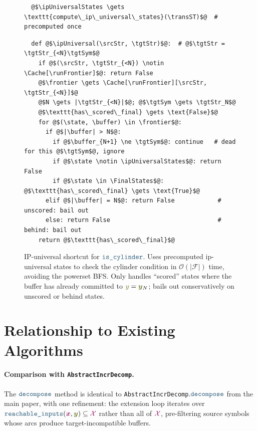 \documentclass{article}
\theoremstyle{plain}
\newcommand{\mymacro}[1]{#1}
\newcommand{\srcStr}{\ensuremath{{\color{TokenColor}\boldsymbol{x}}}\xspace}
\newcommand{\tgtSym}{{\color{CharacterColor}y}}
\newcommand{\tgtStr}{{\color{CharacterColor}\boldsymbol{y}}}
\newcommand{\srcAlphabet}[0]{{\color{TokenColor}\ensuremath{\mathcal{X}}}\xspace}
\newcommand{\transST}{{\color{CharacterColor}\texttt{f}}}
\newcommand{\FinalStates}{\mymacro{\mathsf{F}}}
\newcommand{\state}{\mymacro{s}}
\newcommand{\frontier}{\mathcal{F}}
\newcommand{\buffer}{{\color{CharacterColor}\boldsymbol{b}}}
\newcommand{\myMintedFunc}[1]{\mbox{\texttt{{\color{StormBlue}#1}}}}
\newcommand{\continuous}[0]{\myMintedFunc{is\_cylinder}}
\newcommand{\decompose}[0]{\myMintedFunc{decompose}}
\newcommand{\runFrontier}[0]{\myMintedFunc{run}}
\newcommand{\reachableInputs}[0]{\myMintedFunc{reachable\_inputs}}
\newcommand{\ipUniversal}[0]{\myMintedFunc{fast\_univ\_filter}}
\newcommand{\ipUniversalStates}[0]{U}
\newcommand{\Cache}{\mymacro{\texttt{cache}}}
\begin{document}
\begin{figure}[H]
\centering
\begin{verbatim}
  @$\ipUniversalStates \gets \texttt{compute\_ip\_universal\_states}(\transST)$@  # precomputed once
\end{verbatim}
\begin{verbatim}
  def @$\ipUniversal(\srcStr, \tgtStr)$@:  # @$\tgtStr = \tgtStr_{<N}\tgtSym$@
    if @$(\srcStr, \tgtStr_{<N}) \notin \Cache[\runFrontier]$@: return False
    @$\frontier \gets \Cache[\runFrontier][\srcStr, \tgtStr_{<N}]$@
    @$N \gets |\tgtStr_{<N}|$@; @$\tgtSym \gets \tgtStr_N$@
    @$\texttt{has\_scored\_final} \gets \text{False}$@
    for @$(\state, \buffer) \in \frontier$@:
      if @$|\buffer| > N$@:
        if @$\buffer_{N+1} \ne \tgtSym$@: continue   # dead for this @$\tgtSym$@, ignore
        if @$\state \notin \ipUniversalStates$@: return False
        if @$\state \in \FinalStates$@: @$\texttt{has\_scored\_final} \gets \text{True}$@
      elif @$|\buffer| = N$@: return False            # unscored: bail out
      else: return False                              # behind: bail out
    return @$\texttt{has\_scored\_final}$@
\end{verbatim}
\caption{IP-universal shortcut for $\continuous$.
Uses precomputed ip-universal states to check the cylinder condition in
$\mathcal{O}(|\frontier|)$ time, avoiding the powerset BFS.
Only handles ``scored'' states where the buffer has already committed to
$\tgtSym = \tgtStr_N$; bails out conservatively on unscored or behind states.}
\label{fig:fast-univ-filter}
\end{figure}


\section{Relationship to Existing Algorithms}

\paragraph{Comparison with \texttt{AbstractIncrDecomp}.}
The $\decompose$ method is identical to
\texttt{AbstractIncrDecomp}.$\decompose$ from the main paper, with one
refinement: the extension loop iterates over
$\reachableInputs(\srcStr, \tgtStr) \subseteq \srcAlphabet$ rather than all of
$\srcAlphabet$, pre-filtering source symbols whose arcs produce
target-incompatible buffers.
\end{document}
